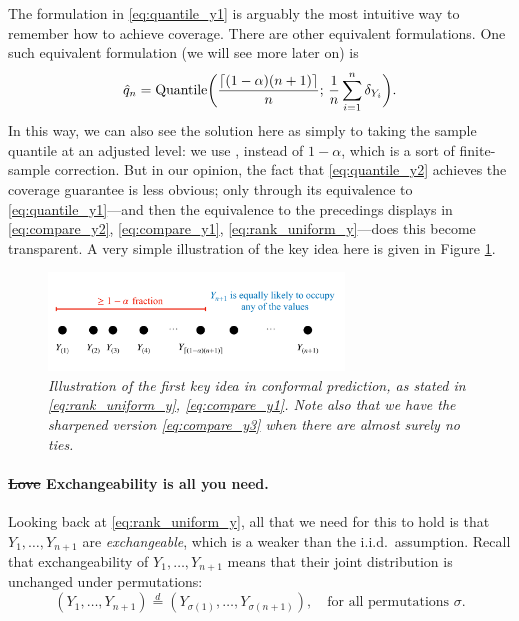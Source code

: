 \documentclass{article}
\begin{document}
The formulation in \eqref{eq:quantile_y1} is arguably the most intuitive way to
remember how to achieve coverage. There are other equivalent formulations. One
such equivalent formulation (we will see more later on) is
\begin{equation}
\label{eq:quantile_y2}
\hat{q}_n = \mathrm{Quantile}\bigg( \frac{\lceil (1-\alpha)(n+1) \rceil}{n}; \,
\frac{1}{n} \sum_{i=1}^n \delta_{Y_i} \bigg).
\end{equation}
In this way, we can also see the solution here as simply to taking the sample 
quantile at an adjusted level: we use , instead of $1-\alpha$, which is a sort of finite-sample correction. But
in our opinion, the fact that  \eqref{eq:quantile_y2} achieves the coverage
guarantee is less obvious; only through its equivalence to
\eqref{eq:quantile_y1}---and then the equivalence to the precedings displays in
\eqref{eq:compare_y2}, \eqref{eq:compare_y1}, \eqref{eq:rank_uniform_y}---does
this become transparent. A very simple illustration of the key idea here is
given in Figure \ref{fig:illustration}.     

\begin{figure}[htb]
\centering
\includegraphics[width=0.7\textwidth]{illustration.pdf}
\caption{\it Illustration of the first key idea in conformal prediction, as
  stated in \eqref{eq:rank_uniform_y}, \eqref{eq:compare_y1}. Note also that we
  have the sharpened version \eqref{eq:compare_y3} when there are almost surely
  no ties.}    
\label{fig:illustration}
\end{figure}

\paragraph{\sout{Love} Exchangeability is all you need.}

\def\deq{\overset{d}{=}}

Looking back at \eqref{eq:rank_uniform_y}, all that we need for this to hold is 
that $Y_1,\dots,Y_{n+1}$ are \emph{exchangeable}, which is a weaker than the  
i.i.d.\ assumption. Recall that exchangeability of $Y_1,\dots,Y_{n+1}$ means
that their joint distribution is unchanged under permutations:
\[
(Y_1, \dots, Y_{n+1}) \deq (Y_{\sigma(1)} ,\dots, Y_{\sigma(n+1)}), \quad
\text{for all permutations $\sigma$}.
\]
\end{document}
